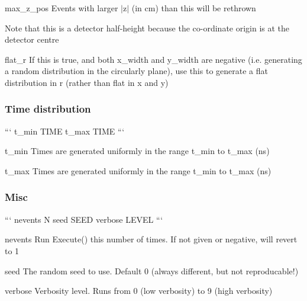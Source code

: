 \begin{DoxyItemize}
\item {\ttfamily max\-\_\-z\-\_\-pos} Events with larger {\ttfamily $|$z$|$} (in cm) than this will be rethrown
\begin{DoxyItemize}
\item Note that this is a detector half-\/height because the co-\/ordinate origin is at the detector centre
\end{DoxyItemize}
\item {\ttfamily flat\-\_\-r} If this is true, and both {\ttfamily x\-\_\-width} and {\ttfamily y\-\_\-width} are negative (i.\-e. generating a random distribution in the circularly plane), use this to generate a flat distribution in {\ttfamily r} (rather than flat in {\ttfamily x} and {\ttfamily y})
\end{DoxyItemize}

\subsubsection*{Time distribution}

``` t\-\_\-min T\-I\-M\-E t\-\_\-max T\-I\-M\-E ```


\begin{DoxyItemize}
\item {\ttfamily t\-\_\-min} Times are generated uniformly in the range {\ttfamily t\-\_\-min} to {\ttfamily t\-\_\-max} (ns)
\item {\ttfamily t\-\_\-max} Times are generated uniformly in the range {\ttfamily t\-\_\-min} to {\ttfamily t\-\_\-max} (ns)
\end{DoxyItemize}

\subsubsection*{Misc}

``` nevents N seed S\-E\-E\-D verbose L\-E\-V\-E\-L ```


\begin{DoxyItemize}
\item {\ttfamily nevents} Run Execute() this number of times. If not given or negative, will revert to 1
\item {\ttfamily seed} The random seed to use. Default 0 (always different, but not reproducable!)
\item {\ttfamily verbose} Verbosity level. Runs from 0 (low verbosity) to 9 (high verbosity) 
\end{DoxyItemize}